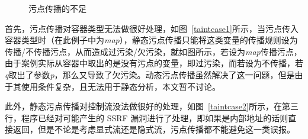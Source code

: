 \begin{figure}[!htbp]
	\centering
	\caption{污点传播的不足}
	\label{fig:rq3} %
\end{figure}
首先，污点传播对容器类型无法做很好处理，如图~\ref{taintcase1}所示，当污点传入容器类型时（在此例子中为\textit{map}），静态污点传播只能将这类变量的传播规则设为传播/不传播污点，从而造成过污染/欠污染，就如图所示，若设为\textit{map}传播污点，由于案例实际从容器中取出的是没有污点的变量，即过污染，而若设为不传播，若\textit{q}取出了参数\textit{p}，那么又导致了欠污染。动态污点传播虽然解决了这一问题，但是由于其使用条件复杂，且无法用于静态分析，本文暂不讨论。

此外，静态污点传播对控制流没法做很好的处理，如图~\ref{taintcase2}所示，在第三行，程序已经对可能产生的 SSRF 漏洞进行了处理，即如果是内部地址的话则直接返回，但是不论是考虑显式流还是隐式流，污点传播都不能避免这一类误报。

